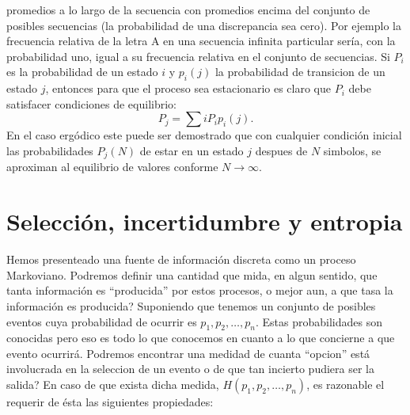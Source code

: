 promedios a lo largo de la secuencia con promedios encima del conjunto
de posibles secuencias (la probabilidad de una discrepancia sea
cero). Por ejemplo la frecuencia relativa de la letra A en una
secuencia infinita particular ser\'{i}a, con la probabilidad uno,
igual a su frecuencia relativa en el conjunto de secuencias.  Si
$P_{i}$ es la probabilidad de un estado $i$ y $p_{i}(j)$ la
probabilidad de transicion de un estado $j$, entonces para que el
proceso sea estacionario es claro que $P_{i}$ debe satisfacer
condiciones de equilibrio:
\begin{equation}
P_{j} = \sum{i} P_{i}p_{i}(j).
\end{equation}
En el caso erg\'{o}dico este puede ser demostrado que con cualquier
condici\'{o}n inicial las probabilidades $P_{j}(N)$ de estar en un
estado $j$ despues de $N$ simbolos, se aproximan al equilibrio de
valores conforme $N \rightarrow \infty$.

\clearpage

\chapter{Selecci\'{o}n, incertidumbre y entropia}
\label{sec:6}

Hemos presenteado una fuente de informaci\'{o}n discreta como un
proceso Markoviano. Podremos definir una cantidad que mida, en algun
sentido, que tanta informaci\'{o}n es ``producida'' por estos
procesos, o mejor aun, a que tasa la informaci\'{o}n es producida?
Suponiendo que tenemos un conjunto de posibles eventos cuya
probabilidad de ocurrir es $p_{1}, p_{2}, \ldots, p_{n}$. Estas
probabilidades son conocidas pero eso es todo lo que conocemos en
cuanto a lo que concierne a que evento
ocurrir\'{a}. Podremos encontrar una medidad de
cuanta ``opcion'' est\'{a} involucrada en la seleccion de un evento o
de que tan incierto pudiera ser la salida?  En caso de que exista
dicha medida, $H(p_{1}, p_{2}, \ldots, p_{n})$, es razonable el
requerir de \'{e}sta las siguientes propiedades:

